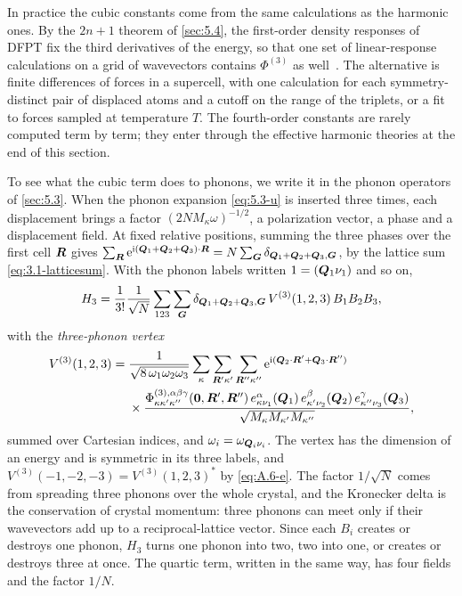 In practice the cubic constants come from the same calculations as the harmonic ones. By the $2n + 1$ theorem of \cref{sec:5.4}, the first-order density responses of DFPT fix the third derivatives of the energy, so that one set of linear-response calculations on a grid of wavevectors contains $\Phi^{(3)}$ as well~\cite[Eq.~(123)]{baroni2001phonons}. The alternative is finite differences of forces in a supercell, with one calculation for each symmetry-distinct pair of displaced atoms and a cutoff on the range of the triplets, or a fit to forces sampled at temperature $T$. The fourth-order constants are rarely computed term by term; they enter through the effective harmonic theories at the end of this section.

To see what the cubic term does to phonons, we write it in the phonon operators of \cref{sec:5.3}. When the phonon expansion \cref{eq:5.3-u} is inserted three times, each displacement brings a factor $(2NM_\kappa\omega)^{-1/2}$, a polarization vector, a phase and a displacement field. At fixed relative positions, summing the three phases over the first cell $\bm{R}$ gives $\sum_{\bm{R}}\mathrm{e}^{\mathrm{i}(\bm{Q}_1 + \bm{Q}_2 + \bm{Q}_3)\cdot\bm{R}} = N\sum_{\bm{G}}\delta_{\bm{Q}_1 + \bm{Q}_2 + \bm{Q}_3,\bm{G}}$, by the lattice sum \cref{eq:3.1-latticesum}. With the phonon labels written $1 = (\bm{Q}_1\nu_1)$ and so on,
\begin{equation}
  H_3 = \frac{1}{3!}\frac{1}{\sqrt N}\sum_{123}\sum_{\bm{G}}\delta_{\bm{Q}_1 + \bm{Q}_2 + \bm{Q}_3,\bm{G}}\,V^{(3)}(1,2,3)\,B_1B_2B_3 ,
  \label{eq:5.7-H3}
\end{equation}
with the \emph{three-phonon vertex}
\begin{equation}
  \begin{split}
  V^{(3)}(1,2,3) = {}& \frac{1}{\sqrt{8\,\omega_1\omega_2\omega_3}}\sum_{\kappa}\sum_{\bm{R}'\kappa'}\sum_{\bm{R}''\kappa''}\mathrm{e}^{\mathrm{i}(\bm{Q}_2\cdot\bm{R}' + \bm{Q}_3\cdot\bm{R}'')}
  \\ &\times \frac{\Phi^{(3),\alpha\beta\gamma}_{\kappa\kappa'\kappa''}(\bm{0},\bm{R}',\bm{R}'')\,e^\alpha_{\kappa\nu_1}(\bm{Q}_1)\,e^\beta_{\kappa'\nu_2}(\bm{Q}_2)\,e^\gamma_{\kappa''\nu_3}(\bm{Q}_3)}{\sqrt{M_\kappa M_{\kappa'}M_{\kappa''}}} ,
  \end{split}
  \label{eq:5.7-V3}
\end{equation}
summed over Cartesian indices, and $\omega_i = \omega_{\bm{Q}_i\nu_i}$. The vertex has the dimension of an energy and is symmetric in its three labels, and $V^{(3)}(-1,-2,-3) = V^{(3)}(1,2,3)^*$ by \cref{eq:A.6-e}. The factor $1/\sqrt N$ comes from spreading three phonons over the whole crystal, and the Kronecker delta is the conservation of crystal momentum: three phonons can meet only if their wavevectors add up to a reciprocal-lattice vector. Since each $B_i$ creates or destroys one phonon, $H_3$ turns one phonon into two, two into one, or creates or destroys three at once. The quartic term, written in the same way, has four fields and the factor $1/N$.

